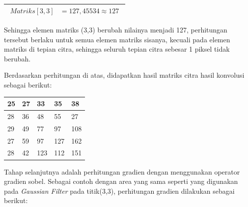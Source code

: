 \begin{table}[H]
	\begin{adjustbox}{width=1\textwidth}
		\begin{tabular}{|p{13.55cm}|}
			\hline
			\begin{equation}\nonumber
			\begin{aligned}
			Matriks[3,3] &= 127,45534 \approx 127
			\end{aligned}
			\end{equation}\\
			\hline
		\end{tabular}
	\end{adjustbox}
\end{table}

\noindent Sehingga elemen matriks (3,3) berubah nilainya menjadi 127, perhitungan tersebut berlaku untuk semua elemen matriks sisanya, kecuali pada elemen matriks di tepian citra, sehingga seluruh tepian citra sebesar 1 piksel tidak berubah.

\noindent Berdasarkan perhitungan di atas, didapatkan hasil matriks citra hasil konvolusi sebagai berikut:

\begin{table}[H]
	\centering
	\begin{small}
		\begin{tabular}{|p{1cm}|p{1cm}|p{1cm}|p{1cm}|p{1cm}|}
			\hline
			25 & 27 & 33 & 35 & 38 \\
			\hline
			28 & 36 & 48 & 55 & 27 \\
			\hline
			29 & 49 & 77 & 97 & 108 \\
			\hline
			27 & 59 & 97 & 127 & 162 \\
			\hline
			28 & 42 & 123 & 112 & 151 \\\hline
		\end{tabular}
	\end{small}
	\label{fig:MatriksCitraHasilKonvolusi}
\end{table}

\noindent Tahap selanjutnya adalah perhitungan gradien dengan menggunakan operator gradien sobel. Sebagai contoh dengan area yang sama seperti yang digunakan pada \textit{Gaussian Filter} pada titik(3,3), perhitungan gradien dilakukan sebagai berikut:

